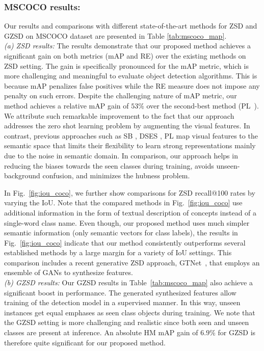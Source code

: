 \documentclass[runningheads]{llncs}
\begin{document}
\subsubsection{MSCOCO results:} Our results and comparisons with different state-of-the-art methods for ZSD and GZSD on MSCOCO dataset are presented in Table \ref{tab:mscoco_map}. \\
\emph{(a) ZSD results:} The results demonstrate that our proposed method achieves a significant gain on both metrics (mAP and RE) over the existing methods on ZSD setting. The gain is specifically  pronounced for the mAP metric, which is more challenging and meaningful to evaluate object detection algorithms. This is because mAP penalizes false positives while the RE measure does not impose any penalty on such errors. Despite the challenging nature of mAP metric, our method achieves a relative mAP gain of $53\%$ over the second-best method (PL~\cite{rahman2018polarity}). We attribute such remarkable improvement to the fact that our approach addresses the zero shot learning problem by augmenting the visual features. In contrast, previous approaches such as SB \cite{bansal2018zero}, DSES \cite{bansal2018zero}, PL \cite{rahman2018polarity} map visual features to the semantic space that limits their flexibility to learn strong representations mainly due to the noise in semantic domain. In comparison, our approach helps in reducing the biases towards the seen classes during training, avoids unseen-background confusion, and minimizes the hubness problem. 

In Fig.~\ref{fig:iou_coco}, we further show comparisons for ZSD recall@100 rates by varying the IoU. Note that the compared methods in Fig.~\ref{fig:iou_coco} use additional information in the form of textual description of concepts instead of a single-word class name. Even though, our proposed method uses much simpler semantic information (only semantic vectors for class labels), the results in Fig.~\ref{fig:iou_coco} indicate that our method consistently outperforms several established methods by a large margin for a variety of IoU settings. This comparison includes a recent generative ZSD approach, GTNet~\cite{zhao2020gtnet}, that employs an ensemble of GANs to synthesize features. \\


\noindent\emph{(b) GZSD results:} Our GZSD results in Table~\ref{tab:mscoco_map} also achieve a significant boost in performance. The generated synthesized features allow training of the detection model in a supervised manner. In this way, unseen instances get equal emphases as seen class objects during training. We note that the GZSD setting is more challenging and realistic since both seen and unseen classes are present at inference. An absolute HM mAP gain of $6.9\%$ for GZSD is therefore quite significant for our proposed method. 
\end{document}
